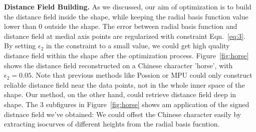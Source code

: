 \documentclass[review]{acmsiggraph}
\begin{document}
\textbf{Distance Field Building. } 
As we discussed, our aim of optimization is to build the distance field inside the shape, while keeping the radial basis function value lower than 0 outside the shape. The error between radial basis function and distance field at medial axis points are regularized with constraint Eqn.~\ref{eq:3}. By setting $\epsilon_2$ in the constraint to a small value, we could get high quality distance field within the shape after the optimization process. Figure~\ref{fig:horse} shows the distance field reconstructed on a Chinese character 'horse', with $\epsilon_2=0.05$. Note that previous methods like Possion or MPU could only construct reliable distance field near the data points, not in the whole inner space of the shape. Our method, on the other hand, could retrieve distance field deep in shape. The 3 subfigures in Figure~\ref{fig:horse} shows am application of the signed distnace field we've obtained: We could offset the Chinese character easily by extracting isocurves of different heights from the radial basis fucntion.
\end{document}
